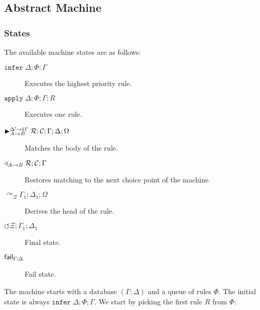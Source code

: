 
%

\newcommand{\trans}[2]{#1 \;\; \mapsto \;\; #2}
\newcommand{\dostate}[3]{\mathtt{infer} \; #1; #2; #3}
\newcommand{\appstate}[4]{\mathtt{apply} \; #1; #2; #3; #4}
\newcommand{\rulestk}[0]{\lstack{R}}
\newcommand{\matstate}[7]{{\blacktriangleright}_{#1}^{#7} \; #2; #3; #4; #5; #6}
\newcommand{\lframe}[6]{\underset{#5 \rightarrow #6}{(#1; #2; #3; #4)}}
\newcommand{\pframe}[6]{\underset{#5 \rightarrow #6}{(#1; #2; #3; #4)}}
\newcommand{\contstate}[4]{\triangleleft_{#1} \; #2; #3; #4}
\newcommand{\failstate}[2]{\m{fail}_{#1; #2}}
\newcommand{\derstate}[4]{\curvearrowright_{#1} #2 ; #3; #4}
\newcommand{\finalstate}[3]{\circlearrowleft #1 ; #2; #3}

\subsection{Abstract Machine}
\subsubsection{States}

The available machine states are as follows:

\begin{description}
   \item[$\dostate{\Delta}{\Phi}{\Gamma}$] Executes the highest priority rule.
   \item[$\appstate{\Delta}{\Phi}{\Gamma}{R}$] Executes one rule.
   \item[$\matstate{A \lolli
      B}{\rulestk}{\lstack{C}}{\Gamma}{\Delta}{\Omega}{\Delta' \rightarrow
         \Omega'}$]
   Matches the body of the rule.
   \item[$\contstate{A \lolli B}{\rulestk}{\lstack{C}}{\Gamma}$] Restores
      matching to the next choice point of the machine.
   \item[$\derstate{\Xi}{\Gamma_1}{\Delta_1}{\Omega}$] Derives the head of the
   rule.
   \item[$\finalstate{\Xi}{\Gamma_1}{\Delta_1}$] Final state.
   \item[$\failstate{\Gamma}{\Delta}$] Fail state.
\end{description}

The machine starts with a database $(\Gamma; \Delta)$ and a queue of rules
$\Phi$. The initial state is always $\dostate{\Delta}{\Phi}{\Gamma}$.
We start by picking the first rule $R$ from $\Phi$:

